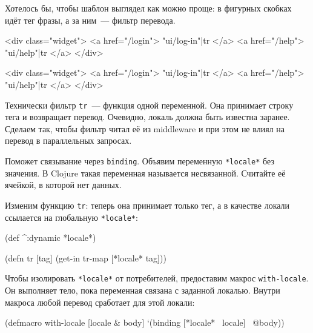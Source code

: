 Хотелось бы, чтобы шаблон выглядел как можно проще: в фигурных скобках идёт тег
фразы, а за ним~--- фильтр перевода.

\ifnarrow

\begin{english}
  \begin{htmldjango}
<div class="widget">
  <a href="/login">
    {{ "ui/log-in"|tr }}
  </a>
  <a href="/help">
    {{ "ui/help"|tr }}
  </a>
</div>
  \end{htmldjango}
\end{english}

\else

\begin{english}
  \begin{htmldjango}
<div class="widget">
  <a href="/login">{{ "ui/log-in"|tr }}</a>
  <a href="/help">{{ "ui/help"|tr }}</a>
</div>
  \end{htmldjango}
\end{english}

\fi

Технически фильтр \verb|tr|~--- функция одной переменной. Она принимает строку
тега и возвращает перевод. Очевидно, локаль должна быть известна
заранее. Сделаем так, чтобы фильтр читал её из middleware и при этом не влиял на
перевод в параллельных запросах.

Поможет связывание через \verb|binding|. Объявим переменную \verb|*locale*| без
значения. В Clojure такая переменная называется несвязанной. Считайте её
ячейкой, в которой нет данных.

Изменим функцию \verb|tr|: теперь она принимает только тег, а в качестве
локали ссылается на глобальную \verb|*locale*|:

\begin{english}
  \begin{clojure}
(def ^:dynamic *locale*)

(defn tr [tag]
  (get-in tr-map [*locale* tag]))
  \end{clojure}
\end{english}


Чтобы изолировать \verb|*locale*| от потребителей, предоставим макрос
\verb|with-locale|. Он выполняет тело, пока переменная связана с заданной
локалью. Внутри макроса любой перевод сработает для этой локали:

\begin{english}
  \begin{clojure}
(defmacro with-locale
  [locale & body]
  `(binding [*locale* ~locale]
     ~@body))
  \end{clojure}
\end{english}

